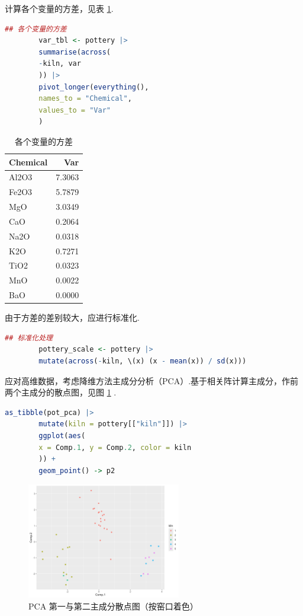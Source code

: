 \documentclass[12pt, a4paper, oneside]{ctexart}
\begin{document}
	计算各个变量的方差，见表 \ref{table:Variance}.
	\begin{lstlisting}[language=R]
		## 各个变量的方差
		var_tbl <- pottery |>
		summarise(across(
		-kiln, var
		)) |>
		pivot_longer(everything(),
		names_to = "Chemical",
		values_to = "Var"
		)
	\end{lstlisting}
	\begin{table}[htbp]
		\centering
		\caption{各个变量的方差}
		\label{table:Variance}
		\begin{tabular}{lr}
			\toprule
			Chemical & Var \\
			\midrule
			Al2O3 & 7.3063 \\
			Fe2O3 & 5.7879 \\
			MgO & 3.0349 \\
			CaO & 0.2064 \\
			Na2O & 0.0318 \\
			\addlinespace
			K2O & 0.7271 \\
			TiO2 & 0.0323 \\
			MnO & 0.0022 \\
			BaO & 0.0000 \\
			\bottomrule
		\end{tabular}
	\end{table}
	
	由于方差的差别较大，应进行标准化.
	\begin{lstlisting}[language=R]
		## 标准化处理
		pottery_scale <- pottery |>
		mutate(across(-kiln, \(x) (x - mean(x)) / sd(x)))
	\end{lstlisting}
	
	应对高维数据，考虑降维方法主成分分析（PCA）.基于相关阵计算主成分，作前两个主成分的散点图，见图 \ref{fig:PCA_kiln} .
	\begin{lstlisting}[language=R]
		as_tibble(pot_pca) |>
		mutate(kiln = pottery[["kiln"]]) |>
		ggplot(aes(
		x = Comp.1, y = Comp.2, color = kiln
		)) +
		geom_point() -> p2
	\end{lstlisting}
	\begin{figure}[H]
		\centering
		\includegraphics[width=0.6\textwidth]{../Figure/PCA_by_kiln.png}
		\caption{PCA 第一与第二主成分散点图（按窑口着色）}
		\label{fig:PCA_kiln}
	\end{figure}
	
\end{document}

